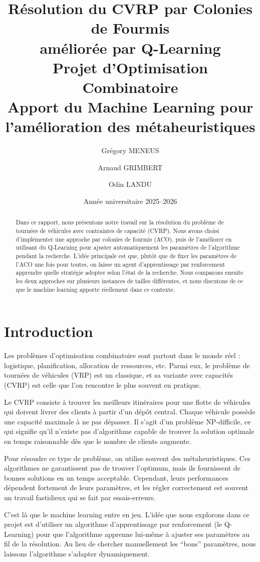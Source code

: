 \documentclass[12pt, a4paper]{article}
\title{
    \vspace{-1cm}
    \textbf{Résolution du CVRP par Colonies de Fourmis\\améliorée par Q-Learning}\\[0.5cm]
    \large Projet d'Optimisation Combinatoire\\
    Apport du Machine Learning pour l'amélioration des métaheuristiques
}
\author{
    Grégory MENEUS \and Arnaud GRIMBERT \and Odin LANDU
}
\date{Année universitaire 2025--2026}
\begin{document}
\maketitle

\begin{abstract}
Dans ce rapport, nous présentons notre travail sur la résolution du problème de tournées de véhicules avec contraintes de capacité (CVRP). Nous avons choisi d'implémenter une approche par colonies de fourmis (ACO), puis de l'améliorer en utilisant du Q-Learning pour ajuster automatiquement les paramètres de l'algorithme pendant la recherche. L'idée principale est que, plutôt que de fixer les paramètres de l'ACO une fois pour toutes, on laisse un agent d'apprentissage par renforcement apprendre quelle stratégie adopter selon l'état de la recherche. Nous comparons ensuite les deux approches sur plusieurs instances de tailles différentes, et nous discutons de ce que le machine learning apporte réellement dans ce contexte.
\end{abstract}

\tableofcontents
\newpage

\section{Introduction}

Les problèmes d'optimisation combinatoire sont partout dans le monde réel : logistique, planification, allocation de ressources, etc. Parmi eux, le problème de tournées de véhicules (VRP) est un classique, et sa variante avec capacités (CVRP) est celle que l'on rencontre le plus souvent en pratique.

Le CVRP consiste à trouver les meilleurs itinéraires pour une flotte de véhicules qui doivent livrer des clients à partir d'un dépôt central. Chaque véhicule possède une capacité maximale à ne pas dépasser. Il s'agit d'un problème NP-difficile, ce qui signifie qu'il n'existe pas d'algorithme capable de trouver la solution optimale en temps raisonnable dès que le nombre de clients augmente.

Pour résoudre ce type de problème, on utilise souvent des métaheuristiques. Ces algorithmes ne garantissent pas de trouver l'optimum, mais ils fournissent de bonnes solutions en un temps acceptable. Cependant, leurs performances dépendent fortement de leurs paramètres, et les régler correctement est souvent un travail fastidieux qui se fait par essais-erreurs.

C'est là que le machine learning entre en jeu. L'idée que nous explorons dans ce projet est d'utiliser un algorithme d'apprentissage par renforcement (le Q-Learning) pour que l'algorithme apprenne lui-même à ajuster ses paramètres au fil de la résolution. Au lieu de chercher manuellement les ``bons'' paramètres, nous laissons l'algorithme s'adapter dynamiquement.
\end{document}
